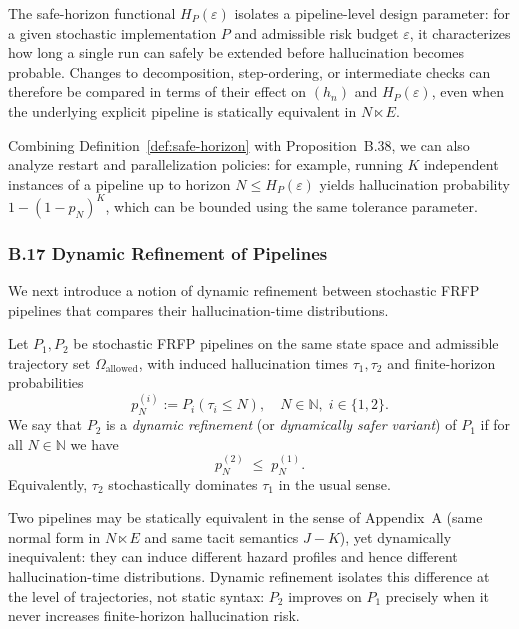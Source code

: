 \begin{remark}
The safe-horizon functional $H_P(\varepsilon)$ isolates a pipeline-level design parameter:
for a given stochastic implementation $P$ and admissible risk budget $\varepsilon$, it
characterizes how long a single run can safely be extended before hallucination becomes
probable. Changes to decomposition, step-ordering, or intermediate checks can therefore
be compared in terms of their effect on $(h_n)$ and $H_P(\varepsilon)$, even when the
underlying explicit pipeline is statically equivalent in $N \ltimes E$.
\end{remark}

Combining Definition~\ref{def:safe-horizon} with Proposition~B.38, we can also analyze
restart and parallelization policies: for example, running $K$ independent instances of a
pipeline up to horizon $N \le H_P(\varepsilon)$ yields hallucination probability
$1 - (1 - p_N)^K$, which can be bounded using the same tolerance parameter.

\subsubsection*{B.17 Dynamic Refinement of Pipelines}

We next introduce a notion of dynamic refinement between stochastic FRFP pipelines that
compares their hallucination-time distributions.

\begin{definition}\label{def:dynamic-refinement}
Let $P_1, P_2$ be stochastic FRFP pipelines on the same state space and admissible trajectory
set $\Omega_{\mathrm{allowed}}$, with induced hallucination times $\tau_1, \tau_2$ and
finite-horizon probabilities
\[
  p_N^{(i)} := P_i(\tau_i \le N), \quad N \in \mathbb{N}, \; i \in \{1,2\}.
\]
We say that $P_2$ is a \emph{dynamic refinement} (or \emph{dynamically safer variant}) of $P_1$
if for all $N \in \mathbb{N}$ we have
\[
  p_N^{(2)} \;\le\; p_N^{(1)}.
\]
Equivalently, $\tau_2$ stochastically dominates $\tau_1$ in the usual sense.
\end{definition}

\begin{remark}
Two pipelines may be statically equivalent in the sense of Appendix~A (same normal form in
$N \ltimes E$ and same tacit semantics $J{-}K$), yet dynamically inequivalent: they can induce
different hazard profiles and hence different hallucination-time distributions.
Dynamic refinement isolates this difference at the level of trajectories, not static syntax:
$P_2$ improves on $P_1$ precisely when it never increases finite-horizon hallucination risk.
\end{remark}

